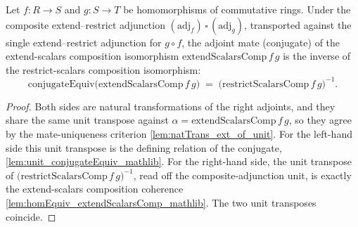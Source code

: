 \begin{lemma}
  \label{lem:conjugateEquiv_extendScalarsComp}
  Let \(f : R \to S\) and \(g : S \to T\) be homomorphisms of commutative rings. Under
  the composite extend--restrict adjunction
  \((\mathrm{adj}_f) \,\square\, (\mathrm{adj}_g)\), transported against the single
  extend--restrict adjunction for \(g \circ f\), the adjoint mate (conjugate) of the
  extend-scalars composition isomorphism \(\mathrm{extendScalarsComp}\,f\,g\) is the
  inverse of the restrict-scalars composition isomorphism:
  \[
    \mathrm{conjugateEquiv}\bigl(\mathrm{extendScalarsComp}\,f\,g\bigr)
    \;=\; \bigl(\mathrm{restrictScalarsComp}\,f\,g\bigr)^{-1}.
  \]
\end{lemma}
\begin{proof}
  Both sides are natural transformations of the right adjoints, and they share the same
  unit transpose against \(\alpha = \mathrm{extendScalarsComp}\,f\,g\), so they agree by
  the mate-uniqueness criterion \cref{lem:natTrans_ext_of_unit}. For the left-hand side
  this unit transpose is the defining relation of the conjugate,
  \cref{lem:unit_conjugateEquiv_mathlib}. For the right-hand side, the unit transpose of
  \(\bigl(\mathrm{restrictScalarsComp}\,f\,g\bigr)^{-1}\), read off the composite-adjunction
  unit, is exactly the extend-scalars composition coherence
  \cref{lem:homEquiv_extendScalarsComp_mathlib}. The two unit transposes coincide.
\end{proof}


